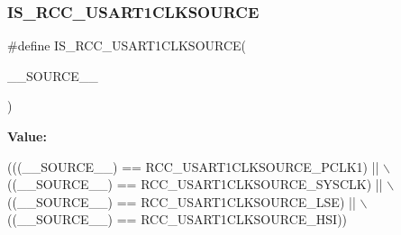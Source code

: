 \subsubsection{\texorpdfstring{I\+S\+\_\+\+R\+C\+C\+\_\+\+U\+S\+A\+R\+T1\+C\+L\+K\+S\+O\+U\+R\+CE}{IS\_RCC\_USART1CLKSOURCE}}
{\footnotesize\ttfamily \#define I\+S\+\_\+\+R\+C\+C\+\_\+\+U\+S\+A\+R\+T1\+C\+L\+K\+S\+O\+U\+R\+CE(\begin{DoxyParamCaption}\item[{}]{\+\_\+\+\_\+\+S\+O\+U\+R\+C\+E\+\_\+\+\_\+ }\end{DoxyParamCaption})}

{\bfseries Value\+:}
\begin{DoxyCode}
(((\_\_SOURCE\_\_) == RCC\_USART1CLKSOURCE\_PCLK1)  || \(\backslash\)
                                             ((\_\_SOURCE\_\_) == RCC\_USART1CLKSOURCE\_SYSCLK) || \(\backslash\)
                                             ((\_\_SOURCE\_\_) == RCC\_USART1CLKSOURCE\_LSE)    || \(\backslash\)
                                             ((\_\_SOURCE\_\_) == RCC\_USART1CLKSOURCE\_HSI))
\end{DoxyCode}
